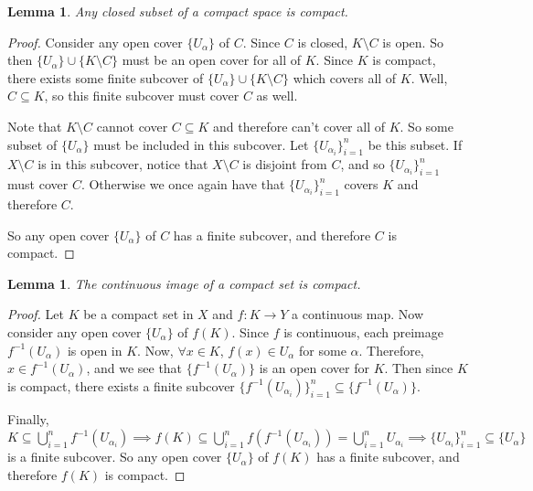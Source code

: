 \documentclass[addpoints,10pt]{exam}
\theoremstyle{plain}
\theoremstyle{definition}
\theoremstyle{plain}
\newtheorem{lem}[thm]{Lemma}
\theoremstyle{definition}
\begin{document}
\begin{lem}\label{lem:hausclosedcompact}
  Any closed subset of a compact space is compact. 
\end{lem}
  \begin{proof}
    Consider any open cover $\{U_{\alpha}\}$ of $C$. Since $C$ is closed, $K\setminus{C}$ is open. So then $\{U_{\alpha}\}\cup \{K\setminus C\}$ must be an open cover for all of $K$. Since $K$ is compact, there exists some finite subcover of $\{U_{\alpha}\}\cup \{K\setminus C\}$ which covers all of $K$. Well, $C\subseteq K$, so this finite subcover must cover $C$ as well.
    
    Note that $K\setminus C$ cannot cover $C\subseteq K$ and therefore can't cover all of $K$. So some subset of $\{U_{\alpha}\}$ must be included in this subcover. Let $\{U_{\alpha_{i}}\}_{i=1}^{n}$ be this subset. If $X\setminus C$ is in this subcover, notice that $X\setminus C$ is disjoint from $C$, and so $\{U_{\alpha_{i}}\}_{i=1}^{n}$ must cover $C$. Otherwise we once again have that $\{U_{\alpha_{i}}\}_{i=1}^{n}$ covers $K$ and therefore $C$.
    
    So any open cover $\{U_{\alpha}\}$ of $C$ has a finite subcover, and therefore $C$ is compact.

  \end{proof}


\begin{lem}\label{lem:contimcom}
  The continuous image of a compact set is compact. 
\end{lem}
  \begin{proof}
    Let $K$ be a compact set in $X$ and $f:K\to Y$ a continuous map. Now consider any open cover $\{U_{\alpha}\}$ of $f(K)$. Since $f$ is continuous, each preimage $f^{-1}(U_{\alpha})$ is open in $K$. Now, $\forall x\in K$, $f(x)\in U_{\alpha}$ for some $\alpha$. Therefore, $x\in f^{-1}(U_{\alpha})$, and we see that $\{f^{-1}(U_{\alpha})\}$ is an open cover for $K$. Then since $K$ is compact, there exists a finite subcover $\{f^{-1}(U_{\alpha_{i}})\}_{i=1}^{n}\subseteq \{f^{-1}(U_{\alpha})\}$. 
    
    Finally, $K\subseteq \bigcup_{i=1}^{n} f^{-1}(U_{\alpha_{i}})\implies f(K)\subseteq \bigcup_{i=1}^{n}f(f^{-1}(U_{\alpha_{i}}))= \bigcup_{i=1}^{n}U_{\alpha_{i}}\implies \{U_{\alpha_{i}}\}_{i=1}^{n}\subseteq \{U_{\alpha}\}$ is a finite subcover. So any open cover $\{U_{\alpha}\}$ of $f(K)$ has a finite subcover, and therefore $f(K)$ is compact.

  \end{proof}
\end{document}
